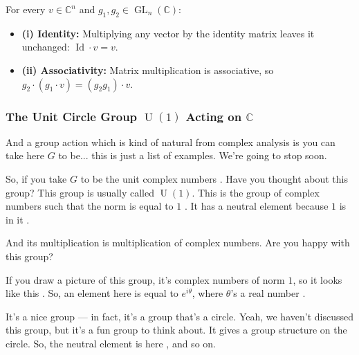 \begin{content}
\begin{steps}
For every $v \in \mathbb{C}^n$ and $g_1, g_2 \in \operatorname{GL}_n(\mathbb{C})$:
\begin{itemize}
    \item \textbf{(i) Identity:} Multiplying any vector by the identity matrix leaves it unchanged: $\operatorname{Id} \cdot v = v$.
    \item \textbf{(ii) Associativity:} Matrix multiplication is associative, so $g_2 \cdot (g_1 \cdot v) = (g_2 g_1) \cdot v$.
\end{itemize}
\end{steps}
\end{content}

\subsubsection{The Unit Circle Group \texorpdfstring{$\operatorname{U}(1)$}{U(1)} Acting on \texorpdfstring{$\mathbb{C}$}{C}}

\begin{speech}[01:00:05 - 01:01:29]
 And a group action which is kind of natural from complex analysis is you can take here $G$ to be... this is just a list of examples. We're going to stop soon.

So, if you take $G$ to be the unit complex numbers . Have you thought about this group? This group is usually called $\operatorname{U}(1)$. This is the group of complex numbers such that the norm is equal to $1$ . It has a neutral element because $1$ is in it .

And its multiplication is multiplication of complex numbers. Are you happy with this group?

If you draw a picture of this group, it's complex numbers of norm $1$, so it looks like this . So, an element here is equal to $e^{i\theta}$, where $\theta$'s a real number .

It's a nice group --- in fact, it's a group that's a circle. Yeah, we haven't discussed this group, but it's a fun group to think about. It gives a group structure on the circle. So, the neutral element is here , and so on.
\end{speech}

